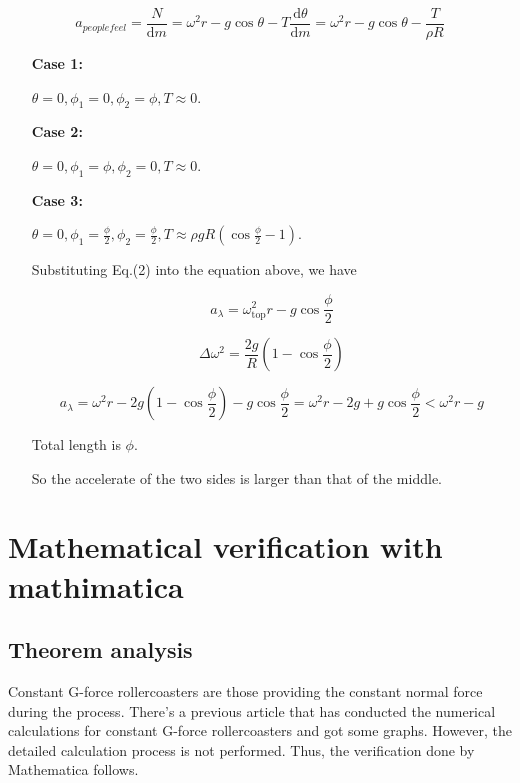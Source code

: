 \documentclass{article}
\begin{document}
    \begin{equation}
        a_{people feel}=\frac{N}{\mathrm{d}m}=\omega^2r-g\cos\theta-T\frac{\mathrm{d}\theta}{\mathrm{d}m}=\omega^2r-g\cos\theta-\frac{T}{\rho R}
    \end{equation}

    \begin{enumerate}

        \item[\textbf{Case 1:}] 
        
        $\theta=0,\phi_1=0,\phi_2=\phi,T\approx 0$.

        \item[\textbf{Case 2:}] 
        
        $\theta=0,\phi_1=\phi,\phi_2=0,T\approx 0$.

        \item[\textbf{Case 3:}] 
        
        $\theta=0,\phi_1=\frac{\phi}{2},\phi_2=\frac{\phi}{2},T\approx \rho gR(\cos\frac{\phi}{2}-1)$.

        Substituting Eq.(2) into the equation above, we have

        $$
        a_{\lambda}=\omega^2_{\mathrm{top}}r-g\cos\frac{\phi}{2}
        $$

        $$
        \Delta \omega^2=\frac{2g}{R}(1-\cos\frac{\phi}{2})
        $$

        $$
        a_{\lambda}=\omega^2r-2g(1-\cos\frac{\phi}{2})-g\cos\frac{\phi}{2}=\omega^2r-2g+g\cos\frac{\phi}{2}<\omega^2r-g
        $$

        

        Total length is $\phi$.

        So the accelerate of the two sides is larger than that of the middle.
\end{enumerate}


\pagebreak
\section{Mathematical verification with mathimatica}
\subsection{Theorem analysis}
Constant G-force rollercoasters are those providing the constant normal force during the process. There's a previous article \cite{ref1} that has conducted the numerical calculations for constant G-force rollercoasters and got some graphs. However, the detailed calculation process is not performed. Thus, the verification done by Mathematica follows.
\end{document}
